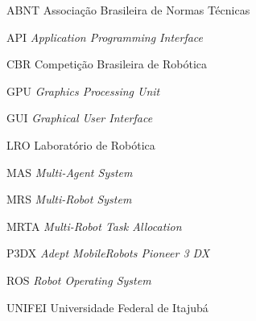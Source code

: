 \renewcommand{\nomname}{\listadesiglasname}
\pdfbookmark[0]{\nomname}{las}
\cleardoublepage
\begin{siglas}
    \item[ABNT] Associação Brasileira de Normas Técnicas
    \item[API] \textit{Application Programming Interface}
    \item[CBR] Competição Brasileira de Robótica
    \item[GPU] \textit{Graphics Processing Unit}
    \item[GUI] \textit{Graphical User Interface}
    \item[LRO] Laboratório de Robótica
    \item[MAS] \textit{Multi-Agent System}
    \item[MRS] \textit{Multi-Robot System}
    \item[MRTA] \textit{Multi-Robot Task Allocation}
    \item[P3DX] \textit{Adept MobileRobots Pioneer 3 DX}
    \item[ROS] \textit{Robot Operating System}
    \item[UNIFEI] Universidade Federal de Itajubá
\end{siglas}